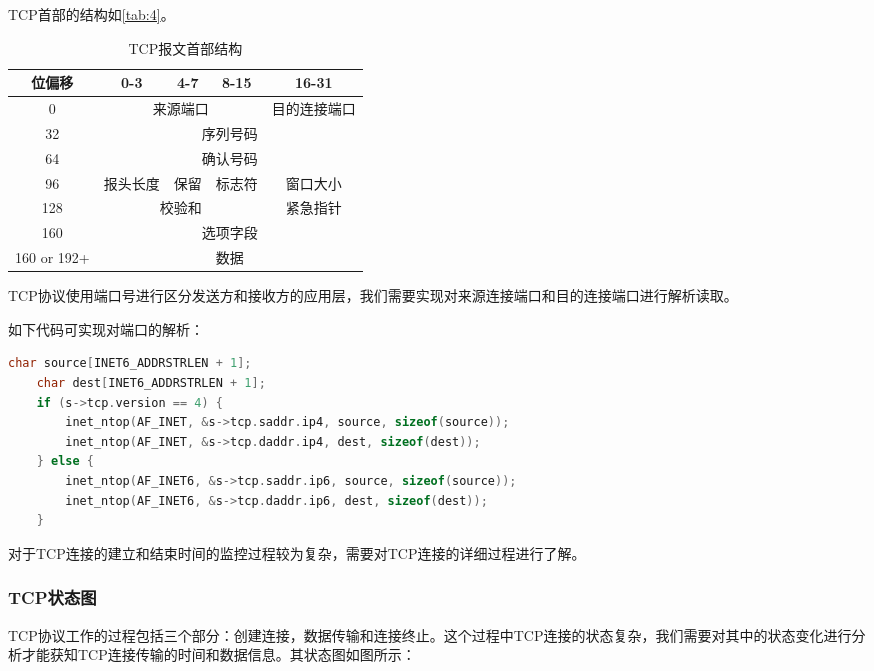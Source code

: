 \documentclass[format=final, language=chinese, degree=fyp]{hustthesis}
\begin{document}
TCP首部的结构如\autoref{tab:4}。

\begin{table}[h!]
\centering
\caption{TCP报文首部结构}\label{tab:4}
\begin{tabular}{|c|c|c|c|c|}
	\hline
	位偏移 & 0-3 & 4-7 & 8-15 & 16-31\\\hline
	0 & \multicolumn{3}{c|}{来源端口} & 目的连接端口 \\\hline
	32 & \multicolumn{4}{c|}{序列号码}  \\\hline
	64 & \multicolumn{4}{c|}{确认号码}  \\\hline
	96 & 报头长度 & 保留 & 标志符 & 窗口大小 \\	\hline
	128 & \multicolumn{3}{c|}{校验和} & 紧急指针 \\\hline
	160 & \multicolumn{4}{c|}{选项字段} \\\hline
	160 or 192+ & \multicolumn{4}{c|}{数据}\\\hline
\end{tabular}
\end{table}

TCP协议使用端口号进行区分发送方和接收方的应用层，我们需要实现对来源连接端口和目的连接端口进行解析读取。

如下代码可实现对端口的解析：

\begin{lstlisting}[language=c]
    char source[INET6_ADDRSTRLEN + 1];
    char dest[INET6_ADDRSTRLEN + 1];
    if (s->tcp.version == 4) {
        inet_ntop(AF_INET, &s->tcp.saddr.ip4, source, sizeof(source));
        inet_ntop(AF_INET, &s->tcp.daddr.ip4, dest, sizeof(dest));
    } else {
        inet_ntop(AF_INET6, &s->tcp.saddr.ip6, source, sizeof(source));
        inet_ntop(AF_INET6, &s->tcp.daddr.ip6, dest, sizeof(dest));
    }
\end{lstlisting}

对于TCP连接的建立和结束时间的监控过程较为复杂，需要对TCP连接的详细过程进行了解。

\subsubsection{TCP状态图}

TCP协议工作的过程包括三个部分：创建连接，数据传输和连接终止。这个过程中TCP连接的状态复杂，我们需要对其中的状态变化进行分析才能获知TCP连接传输的时间和数据信息。其状态图如图所示：
\end{document}
